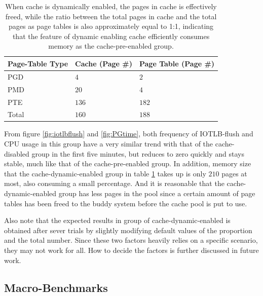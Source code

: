 \begin{table}[!ht]
\footnotesize
\begin{center}
\begin{tabular}{|l|l|l|}
\hline
{\textbf{Page-Table Type}} & {\textbf{Cache (Page \#)}} & {\textbf{Page Table (Page \#)}} \\ \hline
PGD & $4$  & $2$ \\ \hline
PMD & $20$ & $4$  \\ \hline
PTE & $136$ & $182$ \\ \hline
Total & $160$ & $188$ \\ \hline
\end{tabular}
\end{center}
\caption{When cache is dynamically enabled, the pages in cache is effectively freed, while the ratio between the total pages in cache and the total pages as page tables is also approximately equal to 1:1, indicating that the feature of dynamic enabling cache efficiently consumes memory as the cache-pre-enabled group.}
\label{tab:dynPGpool}
\end{table}

From figure \ref{fig:iotlbflush} and \ref{fig:PGtime}, both frequency of IOTLB-flush and CPU usage in this group have a very similar trend with that of the cache-disabled group in the first five minutes, but reduces to zero quickly and stays stable, much like that of the cache-pre-enabled group. In addition, memory size that the cache-dynamic-enabled group in table \ref{tab:dynPGpool} takes up is only $210$ pages at most, also consuming a small percentage. And it is reasonable that the cache-dynamic-enabled group has less pages in the pool since a certain amount of page tables has been freed to the buddy system before the cache pool is put to use.

Also note that the expected results in group of cache-dynamic-enabled is obtained after sever trials by slightly modifying default values of the proportion and the total number. Since these two factors heavily relies on a specific scenario, they may not work for all. How to decide the factors is further discussed in future work.

\subsection{Macro-Benchmarks}


